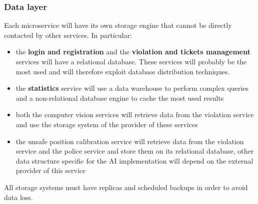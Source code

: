 \subsubsection{Data layer}
Each microservice will have its own storage engine that cannot be directly contacted by other services. In particular:
\begin{itemize}
    \item the \textbf{login and registration} and the \textbf{violation and tickets management} services will have a relational database. These services will probably be the most used and will therefore exploit database distribution techniques.
    \item the \textbf{statistics} service will use a data warehouse to perform complex queries and a non-relational database engine to cache the most used results
    \item both the computer vision services will retrieve data from the violation service and use the storage system of the provider of these services
    \item the unsafe position calibration service will retrieve data from the violation service and the police service and store them on its relational database, other data structure specific for the AI implementation will depend on the external provider of this service
\end{itemize}

All storage systems must have replicas and scheduled backups in order to avoid data loss.